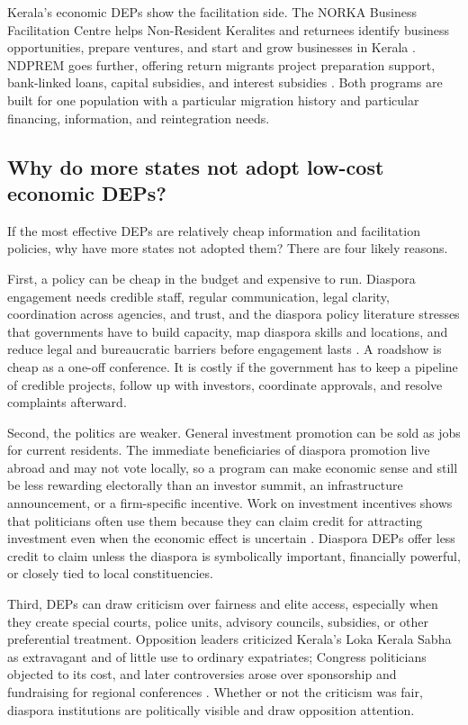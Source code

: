 \documentclass[12pt]{article}
\let\oldsubsection\subsection
\renewcommand{\subsection}{\FloatBarrier\oldsubsection}
\begin{document}
Kerala's economic DEPs show the facilitation side. The NORKA Business Facilitation Centre helps Non-Resident Keralites and returnees identify business opportunities, prepare ventures, and start and grow businesses in Kerala \citep{norka_nbfc_nodate}. NDPREM goes further, offering return migrants project preparation support, bank-linked loans, capital subsidies, and interest subsidies \citep{norka_ndprem_nodate}. Both programs are built for one population with a particular migration history and particular financing, information, and reintegration needs.

\subsection{Why do more states not adopt low-cost economic DEPs?}

If the most effective DEPs are relatively cheap information and facilitation policies, why have more states not adopted them? There are four likely reasons.

First, a policy can be cheap in the budget and expensive to run. Diaspora engagement needs credible staff, regular communication, legal clarity, coordination across agencies, and trust, and the diaspora policy literature stresses that governments have to build capacity, map diaspora skills and locations, and reduce legal and bureaucratic barriers before engagement lasts \citep{newland_developing_2012, ionescu_engaging_2006}. A roadshow is cheap as a one-off conference. It is costly if the government has to keep a pipeline of credible projects, follow up with investors, coordinate approvals, and resolve complaints afterward.

Second, the politics are weaker. General investment promotion can be sold as jobs for current residents. The immediate beneficiaries of diaspora promotion live abroad and may not vote locally, so a program can make economic sense and still be less rewarding electorally than an investor summit, an infrastructure announcement, or a firm-specific incentive. Work on investment incentives shows that politicians often use them because they can claim credit for attracting investment even when the economic effect is uncertain \citep{jensen_pass_2014, jensen_incentives_2018}. Diaspora DEPs offer less credit to claim unless the diaspora is symbolically important, financially powerful, or closely tied to local constituencies.

Third, DEPs can draw criticism over fairness and elite access, especially when they create special courts, police units, advisory councils, subsidies, or other preferential treatment. Opposition leaders criticized Kerala's Loka Kerala Sabha as extravagant and of little use to ordinary expatriates; Congress politicians objected to its cost, and later controversies arose over sponsorship and fundraising for regional conferences \citep{tnn_cut_2022, express_news_services_udf_2023}. Whether or not the criticism was fair, diaspora institutions are politically visible and draw opposition attention.
\end{document}
